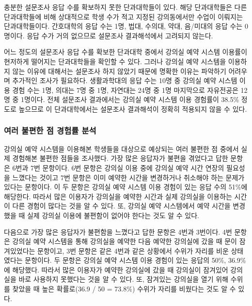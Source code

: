 \documentclass[11pt,a4paper]{article}
\begin{document}
충분한 설문조사 응답 수를 확보하지 못한 단과대학들이 있다. 해당 단과대학들은
다른 단과대학들에 비해 상대적으로 학생 수가 적고 지정된 강의동에서만 수업이
이뤄지는 단과대학들이다. 간호대학의 응답 수는 1명, 법대, 수의대, 약대,
음/미대의 응답 수는 0명이다. 응답 수가 거의 없으므로 설문조사 결과해석에서
고려되지 않는다.

어느 정도의 설문조사 응답 수를 확보한 단과대학 중에서 강의실 예약 시스템
이용률이 현저하게 떨어지는 단과대학들을 확인할 수 있다. 그러나 강의실 예약
시스템을 이용하지 않는 이유에 대해서는 설문조사 하지 않았기 때문에 명확한
이유는 파악하기 어려우며 추가적인 조사가 필요하다. 생활과학대의 응답 수는 10명
중 강의실 예약 시스템 이용 경험 수는 1명, 의대는 7명 중 1명, 자연대는 24명 중
1명 마지막으로 자유전공은 12명 중 1명이다. 전체 설문조사 결과에서는 강의실 예약
시스템 이용 경험률이 38.5\% 정도로 높으므로 이 단과대학에서는 설문조사
결과해석이 정확히 적용되지 않을 수 있다.

\subsubsection{여러 불편한 점 경험률 분석}
강의실 예약 시스템을 이용해본 학생들을 대상으로 예상되는 여러 불편한 점 중에서
실제 경험해본 불편한 점들을 조사했다. 가장 많은 응답자가 불편을 겪었다고 답한
문항은 6번과 7번 문항이다. 6번 문항은 강의실 이용 중에 강의실 예약 시간 연장의
필요성을 느꼈다는 것이고 7번 문항은 이미 예약한 시간을 변경하거나 취소해야 하는
문제가 있다는 문항이다. 이 두 문항은 강의실 예약 시스템 이용 경험이 있는 응답
수의 51\%에 해당한다. 따라서 많은 이용자가 강의실을 예약한 시간과 실제 강의실을
이용하는 시간이 다른 경험이 많다는 것을 알 수 있다. 또, 강의실 예약 시스템에서
예약 시간을 변경했을 때 실제 강의실 이용에 불편함이 없어야 한다는 것도 알 수
있다.

다음으로 가장 많은 응답자가 불편함을 느꼈다고 답한 문항은 4번과 3번이다. 4번
문항은 강의실 예약 시스템을 통해 강의실을 예약한 다음 예약한 강의실에 갔을 때
문이 잠겨있었다는 문항이고, 3번 문항은 같은 4번과 같은 상황에서 수위가 자리를
비운 상태였다는 문항이다. 두 문항은 강의실 예약 시스템 이용 경험이 있는 응답의
50\%, 36.9\%에 해당했다. 따라서 많은 이용자가 예약한 강의실에 갔을 때 강의실이
잠겨있어 강의실을 바로 사용하지 못했다는 것을 알 수 있다. 또, 잠겨있는 강의실을
열기 위해 수위를 찾았을 때 높은 확률로(36.9 / 50 = 73.8\%) 수위가 자리를
비웠다는 것도 알 수 있다.
\end{document}
